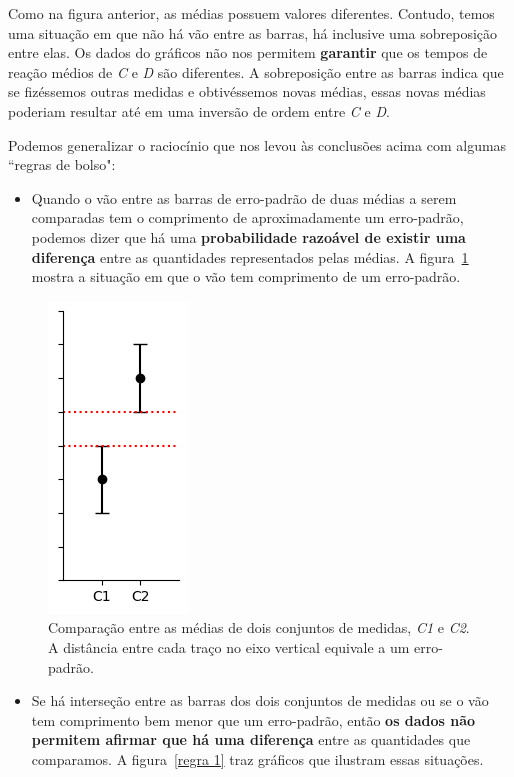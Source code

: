 \documentclass[12pt, a4paper]{article}
\begin{document}
Como na figura anterior, as médias possuem valores diferentes. Contudo, temos uma situação em que não há vão entre as barras, há inclusive uma sobreposição entre elas. Os dados do gráficos não nos permitem \textbf{garantir} que os tempos de reação médios de \textit{C} e \textit{D} são diferentes. A sobreposição entre as barras indica que se fizéssemos outras medidas e obtivéssemos novas médias, essas novas médias poderiam resultar até em uma inversão de ordem entre \textit{C} e \textit{D}.


Podemos generalizar o raciocínio que nos levou às conclusões acima com algumas ``regras de bolso": 

\smallskip

\begin{itemize}
\item Quando o vão entre as barras de erro-padrão de duas médias a serem comparadas tem o comprimento de aproximadamente um erro-padrão, podemos dizer que há uma \textbf{probabilidade razoável de existir uma diferença} entre as quantidades representados pelas médias. A figura~\ref{regra única} mostra a situação em que o vão tem comprimento de um erro-padrão.
\end{itemize}

\begin{figure}[H]
    \centering
    \includegraphics[width=0.25\linewidth]{regra 2.1.png}
    \caption{Comparação entre as médias de dois conjuntos de medidas, \textit{C1} e \textit{C2}. A distância entre cada traço no eixo vertical equivale a um erro-padrão.}
    \label{regra única}
\end{figure}

\smallskip

\begin{itemize}
\item Se há interseção entre as barras dos dois conjuntos de medidas ou se o vão tem comprimento bem menor que um erro-padrão, então \textbf{os dados não permitem afirmar que há uma diferença} entre as quantidades que comparamos. A figura~\ref{regra 1} traz gráficos que ilustram essas situações.
\end{itemize}
\end{document}

